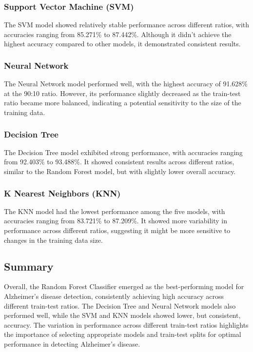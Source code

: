 \documentclass[a4paper,12pt]{report}
\begin{document}
\subsubsection{Support Vector Machine (SVM)}

The SVM model showed relatively stable performance across different ratios, with accuracies ranging from 85.271\% to 87.442\%. Although it didn't achieve the highest accuracy compared to other models, it demonstrated consistent results.

\subsubsection{Neural Network}

The Neural Network model performed well, with the highest accuracy of 91.628\% at the 90:10 ratio. However, its performance slightly decreased as the train-test ratio became more balanced, indicating a potential sensitivity to the size of the training data.

\subsubsection{Decision Tree}

The Decision Tree model exhibited strong performance, with accuracies ranging from 92.403\% to 93.488\%. It showed consistent results across different ratios, similar to the Random Forest model, but with slightly lower overall accuracy.

\subsubsection{K Nearest Neighbors (KNN)}

The KNN model had the lowest performance among the five models, with accuracies ranging from 83.721\% to 87.209\%. It showed more variability in performance across different ratios, suggesting it might be more sensitive to changes in the training data size.

\subsection{Summary}

Overall, the Random Forest Classifier emerged as the best-performing model for Alzheimer's disease detection, consistently achieving high accuracy across different train-test ratios. The Decision Tree and Neural Network models also performed well, while the SVM and KNN models showed lower, but consistent, accuracy. The variation in performance across different train-test ratios highlights the importance of selecting appropriate models and train-test splits for optimal performance in detecting Alzheimer's disease.
\end{document}
